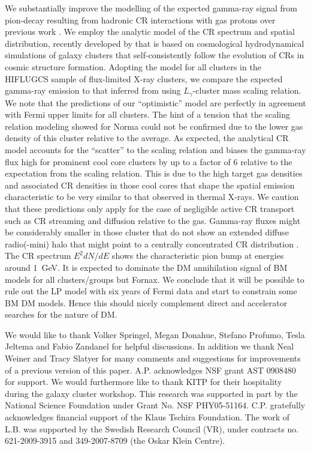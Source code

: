 \documentclass[10pt,aps,pra,reprint,amsmath,amsfonts,amssymb,showpacs,nofootinbib,floatfix]{revtex4-1}
\begin{document}
We substantially improve the modelling of the expected gamma-ray
signal from pion-decay resulting from hadronic CR interactions with
gas protons over previous work \citep{2010ApJ...717L..71A}. We employ
the analytic model of the CR spectrum and spatial distribution,
recently developed by \citet{2010MNRAS.409..449P} that is based on
cosmological hydrodynamical simulations of galaxy clusters that
self-consistently follow the evolution of CRs in cosmic structure
formation. Adopting the model for all clusters in the HIFLUGCS sample
of flux-limited X-ray clusters, we compare the expected gamma-ray
emission to that inferred from using $L_\gamma$-cluster mass scaling
relation. We note that the predictions of our ``optimistic'' model are
perfectly in agreement with Fermi upper limits for all clusters.  The
hint of a tension that the scaling relation modeling showed for Norma
\citep{2010ApJ...717L..71A} could not be confirmed due to the lower
gas density of this cluster relative to the average.  As expected, the
analytical CR model accounts for the ``scatter'' to the scaling
relation and biases the gamma-ray flux high for prominent cool core
clusters by up to a factor of 6 relative to the expectation from the
scaling relation. This is due to the high target gas densities and
associated CR densities in those cool cores that shape the spatial
emission characteristic to be very similar to that observed in thermal
X-rays. We caution that these predictions only apply for the case of
negligible active CR transport such as CR streaming and diffusion
relative to the gas. Gamma-ray fluxes might be considerably smaller in
those cluster that do not show an extended diffuse radio(-mini) halo
that might point to a centrally concentrated CR distribution
\citep{2011A&A...527A..99E}. The CR spectrum $E^2 dN/dE$ shows the
characteristic pion bump at energies around 1~GeV. It is expected to
dominate the DM annihilation signal of BM models for all
clusters/groups but Fornax. We conclude that it will be possible to
rule out the LP model with six years of Fermi data and start to
constrain some BM DM models. Hence this should nicely complement
direct and accelerator searches for the nature of DM.






\smallskip We would like to thank Volker Springel, Megan Donahue,
Stefano Profumo, Tesla Jeltema and Fabio Zandanel for helpful
discussions.  In addition we thank Neal Weiner and Tracy Slatyer for
many comments and suggestions for improvements of a previous version
of this paper. A.P. acknowledges NSF grant AST 0908480 for support. We
would furthermore like to thank KITP for their hospitality during the
galaxy cluster workshop.  This research was supported in part by the
National Science Foundation under Grant No. NSF PHY05-51164.
C.P. gratefully acknowledges financial support of the Klaus Tschira
Foundation. The work of L.B. was supported by the Swedish Research
Council (VR), under contracts no. 621-2009-3915 and 349-2007-8709 (the
Oskar Klein Centre).
\end{document}
